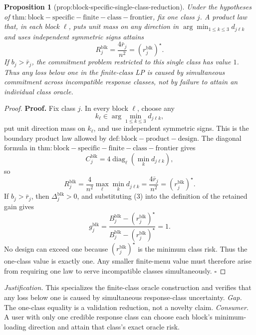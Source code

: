 \documentclass{article}
\newtheorem{proposition}{Proposition}
\begin{document}
\begin{proposition}[prop:block-specific-single-class-reduction]\label{prop:block-specific-single-class-reduction}
Under the hypotheses of \(\mathrm{thm:block-specific-finite-class-frontier}\), fix one class \(j\). A product law that, in each block \(\ell\), puts unit mass on any direction in \(\arg\min_{1\le k\le3}d_{j\ell k}\) and uses independent symmetric signs attains
\[
R_j^{\mathrm{blk}}=\frac{4\bar r_j}{n^2}=(r_j^{\mathrm{blk}})^\star.
\]
If \(b_j>\bar r_j\), the commitment problem restricted to this single class has value \(1\). Thus any loss below one in the finite-class LP is caused by simultaneous commitment across incompatible response classes, not by failure to attain an individual class oracle.
\end{proposition}
\begin{proof}
\textbf{Proof.}
Fix class \(j\).  In every block \(\ell\), choose any
\[
k_\ell\in\arg\min_{1\le k\le3}d_{j\ell k}, \tag{1}
\]
put unit direction mass on \(k_\ell\), and use independent symmetric signs.  This is the boundary product law allowed by \(\mathrm{def:block-product-design}\).  The diagonal formula in \(\mathrm{thm:block-specific-finite-class-frontier}\) gives
\[
C_j^{\mathrm{blk}}
=4\operatorname{diag}_{\ell}
\left(\min_kd_{j\ell k}\right), \tag{2}
\]
so
\[
R_j^{\mathrm{blk}}
=\frac4{n^2}\max_\ell\min_kd_{j\ell k}
=\frac{4\bar r_j}{n^2}
=(r_j^{\mathrm{blk}})^\star. \tag{3}
\]
If \(b_j>\bar r_j\), then \(\Delta_j^{\mathrm{blk}}>0\), and substituting (3) into the definition of the retained gain gives
\[
g_j^{\mathrm{blk}}
=\frac{B_j^{\mathrm{blk}}-(r_j^{\mathrm{blk}})^\star}
{B_j^{\mathrm{blk}}-(r_j^{\mathrm{blk}})^\star}=1. \tag{4}
\]
No design can exceed one because \((r_j^{\mathrm{blk}})^\star\) is the minimum class risk.  Thus the one-class value is exactly one.  Any smaller finite-menu value must therefore arise from requiring one law to serve incompatible classes simultaneously. \(\square\)
\end{proof}
\par\smallskip\noindent \textit{Justification.} This specializes the finite-class oracle construction and verifies that any loss below one is caused by simultaneous response-class uncertainty. \textit{Gap.} The one-class equality is a validation reduction, not a novelty claim. \textit{Consumer.} A user with only one credible response class can choose each block's minimum-loading direction and attain that class's exact oracle risk.
\end{document}
